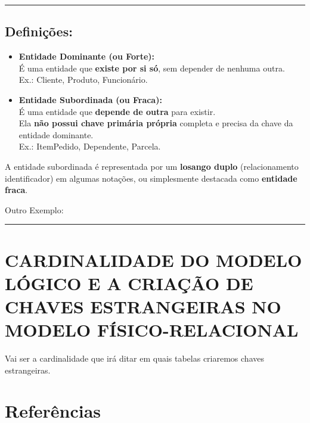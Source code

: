 \documentclass[
]{book}
\makeatletter
\newcommand*\pandocbounded[1]{%
  \sbox\pandoc@box{#1}%
  \Gscale@div\@tempa{\textheight}{\dimexpr\ht\pandoc@box+\dp\pandoc@box\relax}%
  \Gscale@div\@tempb{\linewidth}{\wd\pandoc@box}%
  \ifdim\@tempb\p@<\@tempa\p@\let\@tempa\@tempb\fi%
  \ifdim\@tempa\p@<\p@\scalebox{\@tempa}{\usebox\pandoc@box}%
  \else\usebox{\pandoc@box}%
  \fi%
}
\makeatother
\begin{document}
\begin{center}\rule{0.5\linewidth}{0.5pt}\end{center}

\subsection{Definições:}\label{definiuxe7uxf5es}

\begin{itemize}
\item
  \textbf{Entidade Dominante (ou Forte):}\\
  É uma entidade que \textbf{existe por si só}, sem depender de nenhuma outra.\\
  Ex.: Cliente, Produto, Funcionário.
\item
  \textbf{Entidade Subordinada (ou Fraca):}\\
  É uma entidade que \textbf{depende de outra} para existir.\\
  Ela \textbf{não possui chave primária própria} completa e precisa da chave da entidade dominante.\\
  Ex.: ItemPedido, Dependente, Parcela.
\end{itemize}

A entidade subordinada é representada por um \textbf{losango duplo} (relacionamento identificador) em algumas notações, ou simplesmente destacada como \textbf{entidade fraca}.

\pandocbounded{}

Outro Exemplo:

\pandocbounded{}

\begin{center}\rule{0.5\linewidth}{0.5pt}\end{center}

\section{CARDINALIDADE DO MODELO LÓGICO E A CRIAÇÃO DE CHAVES ESTRANGEIRAS NO MODELO FÍSICO-RELACIONAL}\label{cardinalidade-do-modelo-luxf3gico-e-a-criauxe7uxe3o-de-chaves-estrangeiras-no-modelo-fuxedsico-relacional}

Vai ser a cardinalidade que irá ditar em quais tabelas criaremos chaves estrangeiras.

\section{Referências}\label{referuxeancias-1}
\end{document}
